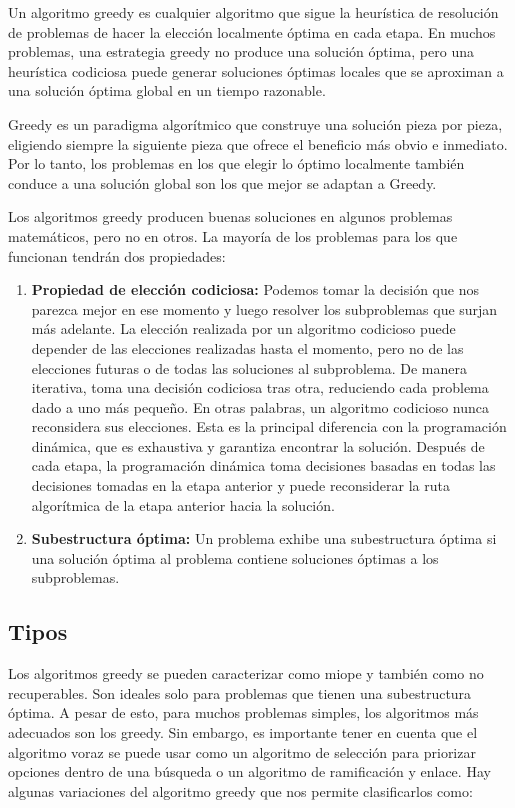 Un algoritmo greedy es cualquier algoritmo que sigue la heurística de resolución de problemas de hacer la elección localmente óptima en cada etapa. En muchos problemas, una estrategia greedy no produce una solución óptima, pero una heurística codiciosa puede generar soluciones óptimas locales que se aproximan a una solución óptima global en un tiempo razonable.

Greedy es un paradigma algorítmico que construye una solución pieza por pieza, eligiendo siempre la siguiente pieza que ofrece el beneficio más obvio e inmediato. Por lo tanto, los problemas en los que elegir lo óptimo localmente también conduce a una solución global son los que mejor se adaptan a Greedy.

Los algoritmos greedy producen buenas soluciones en algunos problemas matemáticos, pero no en otros. La mayoría de los problemas para los que funcionan tendrán dos propiedades:

\begin{enumerate}
	\item \textbf{Propiedad de elección codiciosa:} Podemos tomar la decisión que nos parezca mejor en ese momento y luego resolver los subproblemas que surjan más adelante. La elección realizada por un algoritmo codicioso puede depender de las elecciones realizadas hasta el momento, pero no de las elecciones futuras o de todas las soluciones al subproblema. De manera iterativa, toma una decisión codiciosa tras otra, reduciendo cada problema dado a uno más pequeño. En otras palabras, un algoritmo codicioso nunca reconsidera sus elecciones. Esta es la principal diferencia con la programación dinámica, que es exhaustiva y garantiza encontrar la solución. Después de cada etapa, la programación dinámica toma decisiones basadas en todas las decisiones tomadas en la etapa anterior y puede reconsiderar la ruta algorítmica de la etapa anterior hacia la solución.
	\item \textbf{Subestructura óptima:} Un problema exhibe una subestructura óptima si una solución óptima al problema contiene soluciones óptimas a los subproblemas.
\end{enumerate}

\subsection{Tipos}

Los algoritmos greedy se pueden caracterizar como miope y también como no recuperables. Son ideales solo para problemas que tienen una subestructura óptima. A pesar de esto, para muchos problemas simples, los algoritmos más adecuados son los greedy. Sin embargo, es importante tener en cuenta que el algoritmo voraz se puede usar como un algoritmo de selección para priorizar opciones dentro de una búsqueda o un algoritmo de ramificación y enlace. Hay algunas variaciones del algoritmo greedy que nos permite clasificarlos como:

